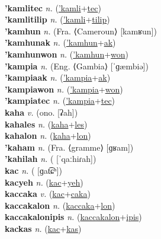  \label{'kamliak} \\
\textbf{'kamlitec} \textit{n.} (\hyperref['kamli]{'kamli}+\hyperref[tec]{tec})
 \label{'kamlitec} \\
\textbf{'kamlitilip} \textit{n.} (\hyperref['kamli]{'kamli}+\hyperref[tilip]{tilip})
 \label{'kamlitilip} \\
\textbf{'kamhun} \textit{n.} (Fra. ⟨Cameroun⟩ [kamʁun])
 \label{'kamhun} \\
\textbf{'kamhunak} \textit{n.} (\hyperref['kamhun]{'kamhun}+\hyperref[ak]{ak})
 \label{'kamhunak} \\
\textbf{'kamhunwon} \textit{n.} (\hyperref['kamhun]{'kamhun}+\hyperref[won]{won})
 \label{'kamhunwon} \\
\textbf{'kampia} \textit{n.} (Eng. ⟨Gambia⟩ [ˈɡæmbiə])
 \label{'kampia} \\
\textbf{'kampiaak} \textit{n.} (\hyperref['kampia]{'kampia}+\hyperref[ak]{ak})
 \label{'kampiaak} \\
\textbf{'kampiawon} \textit{n.} (\hyperref['kampia]{'kampia}+\hyperref[won]{won})
 \label{'kampiawon} \\
\textbf{'kampiatec} \textit{n.} (\hyperref['kampia]{'kampia}+\hyperref[tec]{tec})
 \label{'kampiatec} \\
\textbf{kaha} \textit{v.} (ono. [ʡah])
 \label{kaha} \\
\textbf{kahales} \textit{n.} (\hyperref[kaha]{kaha}+\hyperref[les]{les})
 \label{kahales} \\
\textbf{kahalon} \textit{n.} (\hyperref[kaha]{kaha}+\hyperref[lon]{lon})
 \label{kahalon} \\
\textbf{'kaham} \textit{n.} (Fra. ⟨gramme⟩ [ɡʁam])
 \label{'kaham} \\
\textbf{'kahilah} \textit{n.} ( [ˈqaːhiɾah])
 \label{'kahilah} \\
\textbf{kac} \textit{n.} ( [ɡat͡ɕʰ])
 \label{kac} \\
\textbf{kacyeh} \textit{n.} (\hyperref[kac]{kac}+\hyperref[yeh]{yeh})
 \label{kacyeh} \\
\textbf{kaccaka} \textit{v.} (\hyperref[kac]{kac}+\hyperref[caka]{caka})
 \label{kaccaka} \\
\textbf{kaccakalon} \textit{n.} (\hyperref[kaccaka]{kaccaka}+\hyperref[lon]{lon})
 \label{kaccakalon} \\
\textbf{kaccakalonipis} \textit{n.} (\hyperref[kaccakalon]{kaccakalon}+\hyperref[ipis]{ipis})
 \label{kaccakalonipis} \\
\textbf{kackas} \textit{n.} (\hyperref[kac]{kac}+\hyperref[kas]{kas})
